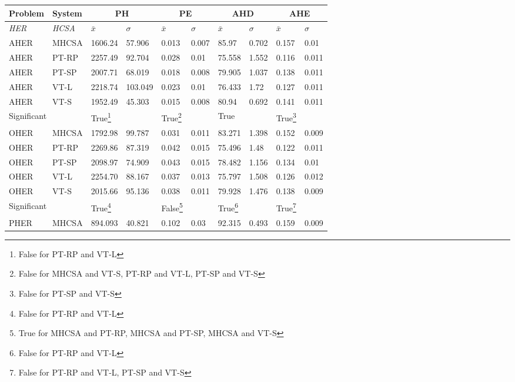 \begin{table}[H]
	\centering\small
	\begin{minipage}{\textwidth} 
		\begin{tabularx}{\textwidth} {llllllllll}
		\toprule
		\textbf{Problem} & \textbf{System} & \multicolumn{2}{c}{\textbf{PH}} & \multicolumn{2}{c}{\textbf{PE}} & \multicolumn{2}{c}{\textbf{AHD}} &\multicolumn{2}{c}{\textbf{AHE}} \\ 
		\midrule
		\emph{HER} & \emph{HCSA} & $\bar{x}$ & $\sigma$ & $\bar{x}$ & $\sigma$ & $\bar{x}$ & $\sigma$ & $\bar{x}$ & $\sigma$ \\ 
		\toprule
		AHER & MHCSA & 1606.24 & 57.906 & 0.013 & 0.007 & 85.97 & 0.702 & 0.157 & 0.01 \\ 
		AHER & PT-RP & 2257.49 & 92.704 & 0.028 & 0.01 & 75.558 & 1.552 & 0.116 & 0.011 \\ 
		AHER & PT-SP & 2007.71 & 68.019 & 0.018 & 0.008 & 79.905 & 1.037 & 0.138 & 0.011 \\ 
		AHER & VT-L & 2218.74 & 103.049 & 0.023 & 0.01 & 76.433 & 1.72 & 0.127 & 0.011 \\ 
		AHER & VT-S & 1952.49 & 45.303 & 0.015 & 0.008 & 80.94 & 0.692 & 0.141 & 0.011 \\ 
		\multicolumn{2}{l}{Significant} & True\footnote{False for PT-RP and VT-L} &  & True\footnote{False for MHCSA and VT-S, PT-RP and VT-L, PT-SP and VT-S} &  & True &  & True\footnote{False for PT-SP and VT-S} &  \\ 
		\midrule
		OHER & MHCSA & 1792.98 & 99.787 & 0.031 & 0.011 & 83.271 & 1.398 & 0.152 & 0.009 \\ 
		OHER & PT-RP & 2269.86 & 87.319 & 0.042 & 0.015 & 75.496 & 1.48 & 0.122 & 0.011 \\ 
		OHER & PT-SP & 2098.97 & 74.909 & 0.043 & 0.015 & 78.482 & 1.156 & 0.134 & 0.01 \\ 
		OHER & VT-L & 2254.70 & 88.167 & 0.037 & 0.013 & 75.797 & 1.508 & 0.126 & 0.012 \\ 
		OHER & VT-S & 2015.66 & 95.136 & 0.038 & 0.011 & 79.928 & 1.476 & 0.138 & 0.009 \\ 
		\multicolumn{2}{l}{Significant} & True\footnote{False for PT-RP and VT-L} &  & False\footnote{True for MHCSA and PT-RP, MHCSA and PT-SP, MHCSA and VT-S} & & True\footnote{False for PT-RP and VT-L} & & True\footnote{False for PT-RP and VT-L, PT-SP and VT-S} & \\ 
		\midrule
		PHER & MHCSA & 894.093 & 40.821 & 0.102 & 0.03 & 92.315 & 0.493 & 0.159 & 0.009 \\ 

\end{tabularx}
\end{minipage}
\end{table}

